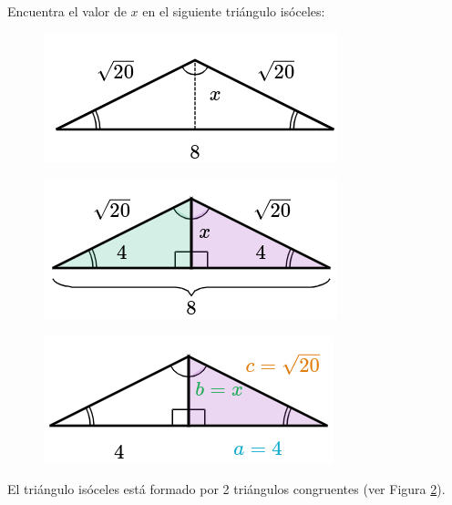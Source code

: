 Encuentra el valor de $x$ en el siguiente triángulo isóceles:

\begin{figure}[H]
    \centering
    \includegraphics[width=0.3\linewidth]{../images/pitagoras3.png}
    \caption{}
    \label{fig:pitagoras3}
\end{figure}
\begin{solutionbox}{15cm}
    \begin{minipage}{0.3\textwidth}
        \begin{figure}[H]
            \centering
            \includegraphics[width=0.7\linewidth]{../images/pitagoras3a.png}
            \caption{}
            \label{fig:pitagoras_3a}
        \end{figure}
        \begin{figure}[H]
            \centering
            \includegraphics[width=0.7\linewidth]{../images/pitagoras3b.png}
            \caption{}
            \label{fig:pitagoras_3b}
        \end{figure}
    \end{minipage}\hfill
    \begin{minipage}{0.65\textwidth}
        El triángulo isóceles está formado por 2 triángulos congruentes (ver Figura \ref{fig:pitagoras_3a}).

\end{minipage}
\end{solutionbox}
